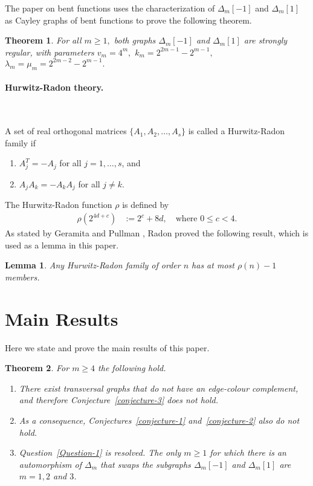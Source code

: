 \documentclass[12pt,a4paper]{article}
\newtheorem{Lemma}{Lemma}
\newtheorem{Theorem}{Theorem}
\begin{document}
The paper on bent functions \cite{Leo15Bent} uses the characterization of $\varDelta_m[-1]$ and $\varDelta_m[1]$ 
as Cayley graphs of bent functions to prove the following theorem. 
\begin{Theorem}\label{Twins-are-strongly-regular-theorem}
%
For all $m \geqslant 1,$
both graphs $\varDelta_m[-1]$ and $\varDelta_m[1]$ are strongly regular, with parameters
$v_m = 4^m,$ $k_m = 2^{2 m - 1} - 2^{m - 1},$ $\lambda_m=\mu_m=2^{2 m - 2} - 2^{m - 1}.$
%
\end{Theorem}

\paragraph*{Hurwitz-Radon theory.}
\label{sec-Hurwitz-Radon}

~

A set of real orthogonal matrices $\{A_1,A_2,\ldots,A_s\}$ is called a Hurwitz-Radon family 
\cite{GerP74a,Hur22,Rad22} if
\begin{enumerate}
 \item
$A_j^T = -A_j$ for all $j=1,\ldots,s$, and
 \item 
$A_j A_k = -A_k A_j$ for all $j \neq k$.
\end{enumerate}
The Hurwitz-Radon function $\rho$ is defined by
\begin{align*}
\rho(2^{4 d + c}) &:= 2^c + 8 d, \quad \text{where~} 0 \leqslant c < 4.
\end{align*}
As stated by Geramita and Pullman \cite[Theorem A]{GerP74a}, Radon \cite{Rad22}
proved the following result, which is used as a lemma in this paper.
\begin{Lemma}\label{Hurwitz-Radon-lemma}
Any Hurwitz-Radon family of order $n$ has at most $\rho(n)-1$ members.
\end{Lemma}
\newpage
\section{Main Results}
\label{sec-Results}
Here we state and prove the main results of this paper.
\begin{Theorem}
\label{Conjectures-are-false-theorem}
For $m \geqslant 4$ the following hold.
\begin{enumerate}
 \item 
There exist transversal graphs that do not have an edge-colour complement, and
therefore Conjecture~\ref{conjecture-3} does not hold.
\item
As a consequence, Conjectures~\ref{conjecture-1} and~\ref{conjecture-2} also do not hold.
\item
Question~\ref{Question-1} is resolved.
The only $m \geqslant 1$ for which there is an automorphism of $\varDelta_m$ 
that swaps the subgraphs $\varDelta_m[-1]$ and $\varDelta_m[1]$
are $m=1,2$ and $3$.
\end{enumerate}

\end{Theorem}
\end{document}
